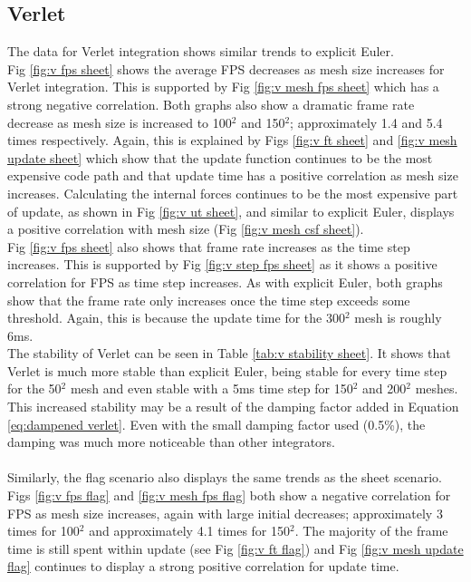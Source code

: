 \subsection{Verlet}
The data for Verlet integration shows similar trends to explicit Euler.
\\Fig \ref{fig:v fps sheet} shows the average FPS decreases as mesh size increases for Verlet integration. This is supported by Fig \ref{fig:v mesh fps sheet} which has a strong negative correlation. Both graphs also show a dramatic frame rate decrease as mesh size is increased to 100$^{2}$ and 150$^{2}$; approximately 1.4 and 5.4 times respectively. Again, this is explained by Figs \ref{fig:v ft sheet} and \ref{fig:v mesh update sheet} which show that the update function continues to be the most expensive code path and that update time has a positive correlation as mesh size increases. Calculating the internal forces continues to be the most expensive part of update, as shown in Fig \ref{fig:v ut sheet}, and similar to explicit Euler, displays a positive correlation with mesh size (Fig \ref{fig:v mesh csf sheet}).
\\Fig \ref{fig:v fps sheet} also shows that frame rate increases as the time step increases. This is supported by Fig \ref{fig:v step fps sheet} as it shows a positive correlation for FPS as time step increases. As with explicit Euler, both graphs show that the frame rate only increases once the time step exceeds some threshold. Again, this is because the update time for the 300$^{2}$ mesh is roughly 6ms.
\\The stability of Verlet can be seen in Table \ref{tab:v stability sheet}. It shows that Verlet is much more stable than explicit Euler, being stable for every time step for the 50$^{2}$ mesh and even stable with a 5ms time step for 150$^{2}$ and 200$^{2}$ meshes. This increased stability may be a result of the damping factor added in Equation \ref{eq:dampened verlet}. Even with the small damping factor used (0.5\%), the damping was much more noticeable than other integrators.
\\\\Similarly, the flag scenario also displays the same trends as the sheet scenario. Figs \ref{fig:v fps flag} and \ref{fig:v mesh fps flag} both show a negative correlation for FPS as mesh size increases, again with large initial decreases; approximately 3 times for 100$^{2}$ and approximately 4.1 times for 150$^{2}$. The majority of the frame time is still spent within update (see Fig \ref{fig:v ft flag}) and Fig \ref{fig:v mesh update flag} continues to display a strong positive correlation for update time.
